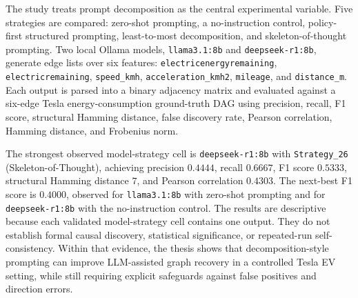 \documentclass[a4paper,11pt,oneside,openany]{report}
\begin{document}
  The study treats prompt decomposition as the central experimental variable.
  Five strategies are compared: zero-shot prompting, a no-instruction control,
  policy-first structured prompting, least-to-most decomposition, and
  skeleton-of-thought prompting. Two local Ollama models,
  \texttt{llama3.1:8b} and \texttt{deepseek-r1:8b}, generate edge lists over
  six features: \texttt{electricenergyremaining},
  \texttt{electricremaining}, \texttt{speed\_kmh},
  \texttt{acceleration\_kmh2}, \texttt{mileage}, and \texttt{distance\_m}.
  Each output is parsed into a binary adjacency matrix and evaluated against a
  six-edge Tesla energy-consumption ground-truth DAG using precision, recall,
  F1 score, structural Hamming distance, false discovery rate, Pearson
  correlation, Hamming distance, and Frobenius norm.

  The strongest observed model-strategy cell is \texttt{deepseek-r1:8b} with
  \texttt{Strategy\_26} (Skeleton-of-Thought), achieving precision
  \(0.4444\), recall \(0.6667\), F1 score \(0.5333\), structural Hamming
  distance \(7\), and Pearson correlation \(0.4303\). The next-best F1 score
  is \(0.4000\), observed for \texttt{llama3.1:8b} with zero-shot prompting
  and for \texttt{deepseek-r1:8b} with the no-instruction control. The results
  are descriptive because each validated model-strategy cell contains one
  output. They do not establish formal causal discovery, statistical
  significance, or repeated-run self-consistency. Within that evidence, the
  thesis shows that decomposition-style prompting can improve LLM-assisted
  graph recovery in a controlled Tesla EV setting, while still requiring
  explicit safeguards against false positives and direction errors.

  \newpage
  \tableofcontents

  \clearpage

  
  
  
  
  
  
  
  
  
  
  

  \clearpage
  \printbibliography

  \clearpage
  \appendix
  
\end{document}
